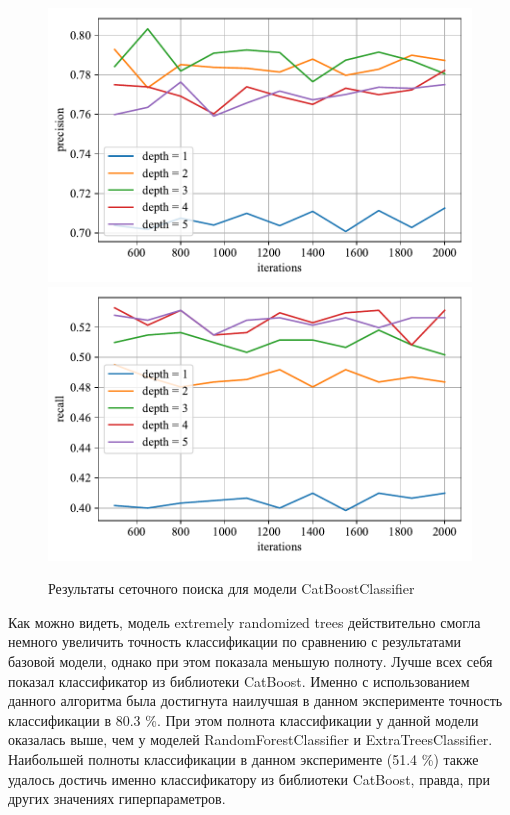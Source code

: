 \begin{figure}
    \centering
    \includegraphics{../images/toloka_catboost_precision.pdf}
    \includegraphics{../images/toloka_catboost_recall.pdf}
    \caption{Результаты сеточного поиска для модели CatBoostClassifier}
    \label{fig:toloka_catboost}
\end{figure}

Как можно видеть, модель extremely randomized trees действительно смогла немного увеличить точность классификации по сравнению с результатами базовой модели, однако при этом показала меньшую полноту. Лучше всех себя показал классификатор из библиотеки CatBoost. Именно с использованием данного алгоритма была достигнута наилучшая в данном эксперименте точность классификации в 80.3 \%. При этом полнота классификации у данной модели оказалась выше, чем у моделей RandomForestClassifier и ExtraTreesClassifier. Наибольшей полноты классификации в данном эксперименте (51.4 \%) также удалось достичь именно классификатору из библиотеки CatBoost, правда, при других значениях гиперпараметров.

